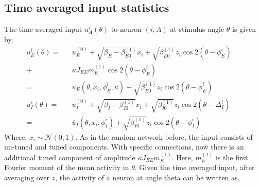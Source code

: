 \subsection{Time averaged input statistics}
The time averaged input $u_A^{i} (\theta)$ to neuron $(i, A)$ at stimulus angle $\theta$ is given by, 
\begin{eqnarray}
\label{ueOfTheta}
u_E^{i} (\theta) =&& u^{(0)}_E + \sqrt{\beta_E - \beta_{E0}^{(1)}} x_i +  \sqrt{\beta_{E0}^{(1)}} z_i \cos 2 (\theta - \phi_E^i) \,\,\,\, \,\,\,\,\nonumber \\
+&& \kappa J_{EE} m_E^{(1)} \cos 2 ( \theta  - \phi_E^i) \\
=&& \overline{u}_E(\theta, x_i, \phi_E^i, \kappa) +  \sqrt{\beta_{E0}^{(1)}} z_i \cos 2 (\theta - \phi_E^i) \\
u_I^{i} (\theta) =&& u^{(0)}_I + \sqrt{\beta_I - \beta_{I0}^{(1)}} x_i +  \sqrt{\beta_{I0}^{(1)}} z_i \cos 2 (\theta - \Delta_I^i) \\
=&& \overline{u}_I(\theta, x_i, \phi_I^i) +  \sqrt{\beta_{I0}^{(1)}} z_i \cos 2 (\theta - \phi_I^i)
\end{eqnarray}
Where, $x_i \sim \mathcal{N}(0, 1)$.  As in the random network before, the input consists of un-tuned and tuned components. With specific connections, now there is an additional tuned component of amplitude  $\kappa J_{EE} m_E^{(1)}$. Here, $m_E^{(1)}$ is the first Fourier moment of the mean activity in $\theta$. 
Given the time averaged input, after averaging over $z$, the activity of a neuron at angle theta can be written as, 
